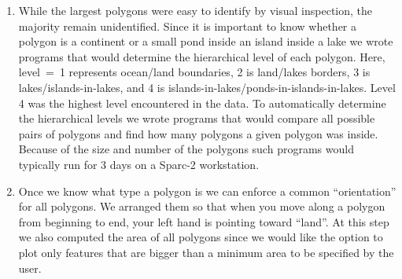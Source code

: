 \begin{enumerate}
\item While the largest polygons were easy to identify by visual
inspection, the majority remain unidentified.  Since it is
important to know whether a polygon is a continent or a small
pond inside an island inside a lake we wrote programs that would
determine the hierarchical level of each polygon.  Here, level~=~1
represents ocean/land boundaries, 2 is land/lakes borders, 3 is
lakes/islands-in-lakes, and 4 is islands-in-lakes/ponds-in-islands-in-lakes.
Level 4 was the highest level encountered in the data.
To automatically determine the hierarchical levels we wrote
programs that would compare all possible pairs of polygons
and find how many polygons a given polygon was inside.  Because
of the size and number of the polygons such programs would
typically run for 3 days on a Sparc-2 workstation.

\item Once we know what type a polygon is we can enforce a
common ``orientation'' for all polygons. We arranged them so
that when you move along a polygon from beginning to end, your
left hand is pointing toward ``land''.  At this step we also
computed the area of all polygons since we would like the
option to plot only features that are bigger than a minimum
area to be specified by the user.


\end{enumerate}
